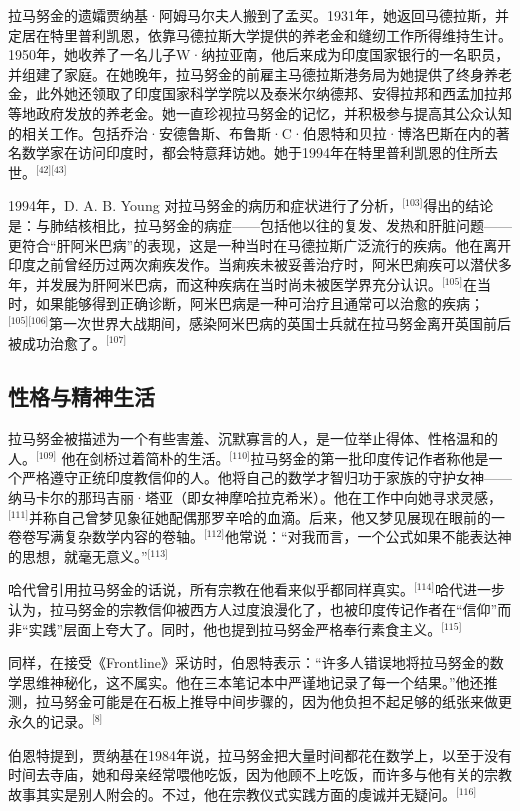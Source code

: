 拉马努金的遗孀贾纳基·阿姆马尔夫人搬到了孟买。1931年，她返回马德拉斯，并定居在特里普利凯恩，依靠马德拉斯大学提供的养老金和缝纫工作所得维持生计。1950年，她收养了一名儿子W·纳拉亚南，他后来成为印度国家银行的一名职员，并组建了家庭。在她晚年，拉马努金的前雇主马德拉斯港务局为她提供了终身养老金，此外她还领取了印度国家科学学院以及泰米尔纳德邦、安得拉邦和西孟加拉邦等地政府发放的养老金。她一直珍视拉马努金的记忆，并积极参与提高其公众认知的相关工作。包括乔治·安德鲁斯、布鲁斯·C·伯恩特和贝拉·博洛巴斯在内的著名数学家在访问印度时，都会特意拜访她。她于1994年在特里普利凯恩的住所去世。\(^\text{[42][43]}\)

1994年，D. A. B. Young 对拉马努金的病历和症状进行了分析，\(^\text{[103]}\)得出的结论是：与肺结核相比，拉马努金的病症——包括他以往的复发、发热和肝脏问题——更符合“肝阿米巴病”的表现，这是一种当时在马德拉斯广泛流行的疾病。他在离开印度之前曾经历过两次痢疾发作。当痢疾未被妥善治疗时，阿米巴痢疾可以潜伏多年，并发展为肝阿米巴病，而这种疾病在当时尚未被医学界充分认识。\(^\text{[105]}\)在当时，如果能够得到正确诊断，阿米巴病是一种可治疗且通常可以治愈的疾病；\(^\text{[105][106]}\)第一次世界大战期间，感染阿米巴病的英国士兵就在拉马努金离开英国前后被成功治愈了。\(^\text{[107]}\)
\subsection{性格与精神生活}
拉马努金被描述为一个有些害羞、沉默寡言的人，是一位举止得体、性格温和的人。\(^\text{[109]}\) 他在剑桥过着简朴的生活。\(^\text{[110]}\)拉马努金的第一批印度传记作者称他是一个严格遵守正统印度教信仰的人。他将自己的数学才智归功于家族的守护女神——纳马卡尔的那玛吉丽·塔亚（即女神摩哈拉克希米）。他在工作中向她寻求灵感，\(^\text{[111]}\)并称自己曾梦见象征她配偶那罗辛哈的血滴。后来，他又梦见展现在眼前的一卷卷写满复杂数学内容的卷轴。\(^\text{[112]}\)他常说：“对我而言，一个公式如果不能表达神的思想，就毫无意义。”\(^\text{[113]}\)

哈代曾引用拉马努金的话说，所有宗教在他看来似乎都同样真实。\(^\text{[114]}\)哈代进一步认为，拉马努金的宗教信仰被西方人过度浪漫化了，也被印度传记作者在“信仰”而非“实践”层面上夸大了。同时，他也提到拉马努金严格奉行素食主义。\(^\text{[115]}\)

同样，在接受《Frontline》采访时，伯恩特表示：“许多人错误地将拉马努金的数学思维神秘化，这不属实。他在三本笔记本中严谨地记录了每一个结果。”他还推测，拉马努金可能是在石板上推导中间步骤的，因为他负担不起足够的纸张来做更永久的记录。\(^\text{[8]}\) 

伯恩特提到，贾纳基在1984年说，拉马努金把大量时间都花在数学上，以至于没有时间去寺庙，她和母亲经常喂他吃饭，因为他顾不上吃饭，而许多与他有关的宗教故事其实是别人附会的。不过，他在宗教仪式实践方面的虔诚并无疑问。\(^\text{[116]}\) 

